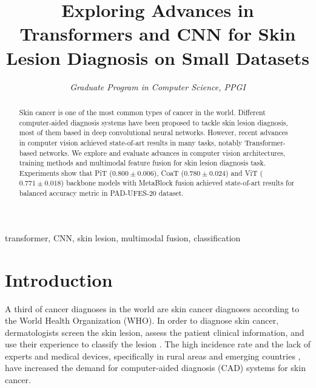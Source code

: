 \documentclass[conference]{IEEEtran}
\begin{document}
\title{Exploring Advances in Transformers and CNN for Skin Lesion Diagnosis on Small Datasets
}


\author{
\and
{}
\textit{Graduate Program in Computer Science, PPGI}\\
}


\maketitle

\begin{abstract}
Skin cancer is one of the most common types of cancer in the world. Different computer-aided diagnosis systems have been proposed to tackle skin lesion diagnosis, most of them based in deep convolutional neural networks. However, recent advances in computer vision achieved state-of-art results in many tasks, notably Transformer-based networks. We explore and evaluate advances in computer vision architectures, training methods and multimodal feature fusion for skin lesion diagnosis task. Experiments show that PiT ($0.800 \pm 0.006$), CoaT ($0.780 \pm 0.024$) and ViT ($0.771 \pm 0.018$) backbone models with MetaBlock fusion achieved state-of-art results for balanced accuracy metric in PAD-UFES-20 dataset.
\end{abstract}

\begin{IEEEkeywords}
transformer, CNN, skin lesion, multimodal fusion, classification
\end{IEEEkeywords}

\section{Introduction}

A third of cancer diagnoses in the world are skin cancer diagnoses according to the World Health Organization (WHO).  In order to diagnose skin cancer, dermatologists screen the skin lesion, assess the patient clinical information, and use their experience to classify the lesion \cite{pacheco2020impact}. The high incidence rate and the lack of experts and medical devices, specifically in rural areas \cite{feng2018comparison}  and emerging countries \cite{scheffler2008forecasting}, have increased the demand for computer-aided diagnosis (CAD) systems for skin cancer. 
\end{document}
